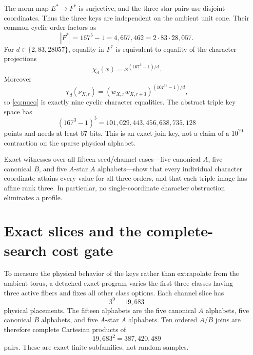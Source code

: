 \documentclass[11pt]{article}
\theoremstyle{remark}
\begin{document}
The norm map $E^*\to F^*$ is surjective, and the three star pairs use
disjoint coordinates.  Thus the three keys are independent on the ambient
unit cone.  Their common cyclic order factors as
\begin{equation}
 |F^*|=167^3-1=4{,}657{,}462=2\cdot83\cdot28{,}057.
 \label{eq:factor}
\end{equation}
For $d\in\{2,83,28057\}$, equality in $F^*$ is equivalent to equality of
the character projections
\[
 \chi_d(x)=x^{(167^3-1)/d}.
\]
Moreover
\[
 \chi_d(\nu_{X,r})
 =(w_{X,r}w_{X,r+3})^{(167^{12}-1)/d},
\]
so \eqref{eq:nueq} is exactly nine cyclic character equalities.  The
abstract triple key space has
\[
 (167^3-1)^3
 =101{,}029{,}443{,}456{,}638{,}735{,}128
\]
points and needs at least $67$ bits.  This is an exact join key, not a claim
of a $10^{20}$ contraction on the sparse physical alphabet.

Exact witnesses over all fifteen seed/channel cases---five canonical
$A$, five canonical $B$, and five $A$-star $A$ alphabets---show that every
individual character coordinate attains every value for all three orders,
and that each triple image has affine rank three.  In particular, no
single-coordinate character obstruction eliminates a profile.

\section{Exact slices and the complete-search cost gate}
\label{sec:cost}

To measure the physical behavior of the keys rather than extrapolate from
the ambient torus, a detached exact program varies the first three classes
having three active fibers and fixes all other class options.  Each channel
slice has
\[
 3^9=19{,}683
\]
physical placements.  The fifteen alphabets are the five canonical
$A$ alphabets, five canonical $B$ alphabets, and five $A$-star
$A$ alphabets.  Ten ordered $A/B$ joins are therefore complete Cartesian
products of
\[
 19{,}683^2=387{,}420{,}489
\]
pairs.  These are exact finite subfamilies, not random samples.
\end{document}
